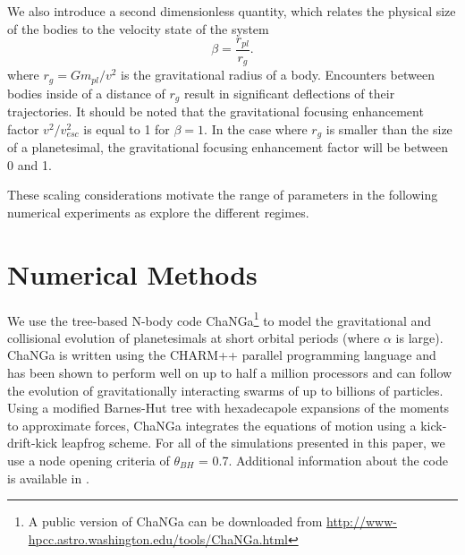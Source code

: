\documentclass[twocolumn]{aastex63}
\begin{document}
We also introduce a second dimensionless quantity, which relates the physical size of the bodies to the velocity state of the system
\begin{equation}\label{eq:beta}
	\beta = \frac{r_{pl}}{r_{g}}.
\end{equation}
where $r_{g} = G m_{pl} / v^{2}$ is the gravitational radius of a body. Encounters between bodies inside of a distance of $r_{g}$ result in significant deflections of their trajectories. It should be noted that the gravitational focusing enhancement factor $v^{2}/v_{esc}^{2}$ is equal to 1 for $\beta = 1$. In the case where $r_{g}$ is smaller than the size of a planetesimal, the gravitational focusing enhancement factor will be between 0 and 1. 

These scaling considerations motivate the range of parameters in the
following numerical experiments as explore the different regimes.






\section{Numerical Methods}\label{sec:methods}

We use the tree-based N-body code {\sc ChaNGa}\footnote{A public version of {\sc ChaNGa} can be downloaded from \url{http://www-hpcc.astro.washington.edu/tools/ChaNGa.html}} to model the gravitational and collisional evolution of planetesimals at short orbital periods (where $\alpha$ is large). {\sc ChaNGa} is written using the {\sc CHARM++} parallel programming language and has been shown to perform well on up to half a million processors \citep{menon15} and can follow the evolution of gravitationally interacting swarms of up to billions of particles. Using a modified Barnes-Hut tree with hexadecapole expansions of the moments to approximate forces, {\sc ChaNGa} integrates the equations of motion using a kick-drift-kick leapfrog scheme. For all of the simulations presented in this paper, we use a node opening criteria of $\theta_{BH}$ = 0.7. Additional information about the code is available in \citep{jetley08,menon15}.
\end{document}
